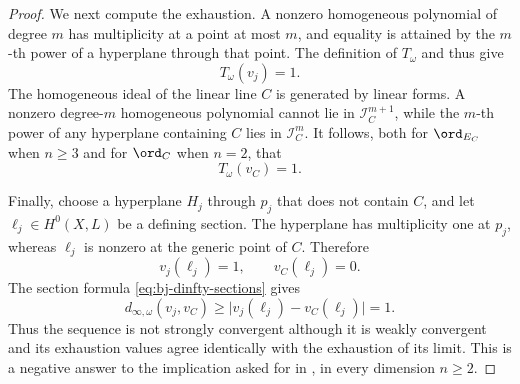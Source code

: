 \begin{proof}
We next compute the exhaustion.  A nonzero homogeneous polynomial of degree
\(m\) has multiplicity at a point at most \(m\), and equality is attained by
the \(m\)-th power of a hyperplane through that point.  The definition of
\(T_\omega\) and \cite[Lemma~4.46]{BJ22} thus give
\[
                              T_\omega(v_j)=1.
\tag{49.17d}\label{eq:ch49-pn-T-point}
\]
The homogeneous ideal of the linear line \(C\) is generated by linear
forms.  A nonzero degree-\(m\) homogeneous polynomial cannot lie in
\(\mathcal I_C^{m+1}\), while the \(m\)-th power of any hyperplane
containing \(C\) lies in \(\mathcal I_C^m\).  It follows, both for
\(\ord_{E_C}\) when \(n\ge3\) and for \(\ord_C\) when \(n=2\), that
\[
                              T_\omega(v_C)=1.
\tag{49.17e}\label{eq:ch49-pn-T-center}
\]

Finally, choose a hyperplane \(H_j\) through \(p_j\) that does not contain
\(C\), and let \(\ell_j\in H^0(X,L)\) be a defining section.  The hyperplane
has multiplicity one at \(p_j\), whereas \(\ell_j\) is nonzero at the
generic point of \(C\).  Therefore
\[
                          v_j(\ell_j)=1,
                          \qquad v_C(\ell_j)=0.
\tag{49.17f}\label{eq:ch49-pn-moving-hyperplane}
\]
The section formula \eqref{eq:bj-dinfty-sections} gives
\[
 d_{\infty,\omega}(v_j,v_C)
 \ge \lvert v_j(\ell_j)-v_C(\ell_j)\rvert=1.
\tag{49.17g}\label{eq:ch49-pn-strong-gap}
\]
Thus the sequence is not strongly convergent although it is weakly
convergent and its exhaustion values agree identically with the exhaustion
of its limit.  This is a negative answer to the implication asked for in
\cite[Question~11.16]{BJ22}, in every dimension \(n\ge2\).
\end{proof}
